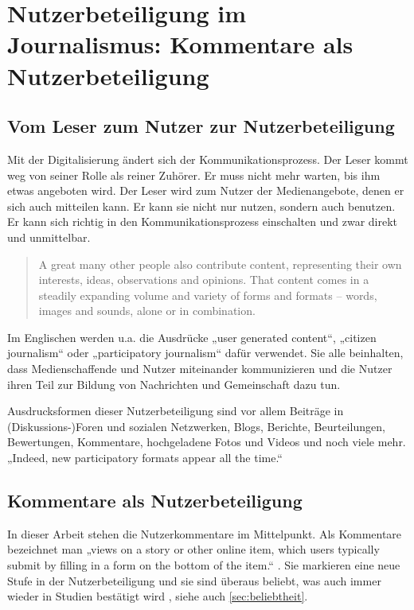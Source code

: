 \chapter{Nutzerbeteiligung im Journalismus: Kommentare als Nutzerbeteiligung}
\label{kap:nutzerbeteiligung}

\section{Vom Leser zum Nutzer zur Nutzerbeteiligung}

Mit der Digitalisierung ändert sich der Kommunikationsprozess. Der Leser kommt
weg von seiner Rolle als reiner Zuhörer. Er muss nicht mehr warten, bis ihm
etwas angeboten wird. Der Leser wird zum Nutzer der Medienangebote, denen er
sich auch mitteilen kann. Er kann sie nicht nur nutzen, sondern auch benutzen.
Er kann sich richtig in den Kommunikationsprozess einschalten und zwar direkt
und unmittelbar.

\begin{quote}
\glqq A great many other people also contribute content, representing their own
interests, ideas, observations and opinions. That content comes in a steadily
expanding volume and variety of forms and formats – words, images and sounds,
alone or in combination.\grqq{} \autocite[S.~1]{participatory}
\end{quote}

Im Englischen werden u.a. die Ausdrücke „user generated content“, „citizen
journalism“ oder „participatory journalism“ \autocite[S.~2]{participatory} dafür
verwendet. Sie alle beinhalten, dass Medienschaffende und Nutzer miteinander
kommunizieren und die Nutzer ihren Teil zur Bildung von Nachrichten und
Gemeinschaft dazu tun.

Ausdrucksformen dieser Nutzerbeteiligung sind vor allem Beiträge in
(Diskussions-)Foren und sozialen Netzwerken, Blogs, Berichte, Beurteilungen,
Bewertungen, Kommentare, hochgeladene Fotos und Videos und noch viele mehr.
„Indeed, new participatory formats appear all the time.“ \autocite[S.~2 und
S.~17]{participatory}


\section{Kommentare als Nutzerbeteiligung}

In dieser Arbeit stehen die Nutzerkommentare im Mittelpunkt. Als Kommentare
bezeichnet man „views on a story or other online item, which users typically
submit by filling in a form on the bottom of the item.“
\autocite[S.~17]{participatory}.  Sie markieren eine neue Stufe in der
Nutzerbeteiligung und sie sind überaus beliebt, was auch immer wieder in Studien
bestätigt wird \autocite[S.~97]{reich}, siehe auch \ref{sec:beliebtheit}.

